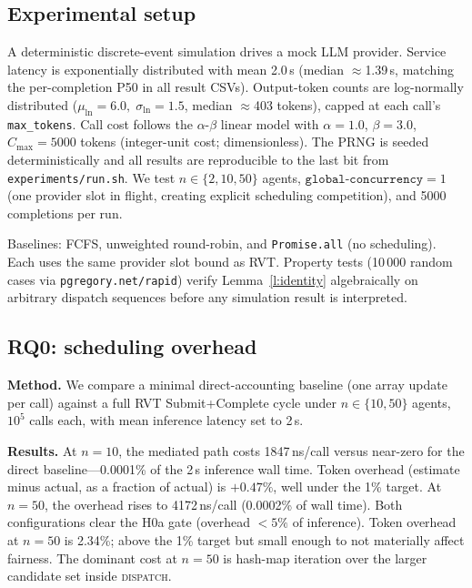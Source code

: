 \documentclass[letterpaper,11pt,leqno]{article}
\begin{document}
\subsection{Experimental setup}\label{s:setup}

A deterministic discrete-event simulation drives a mock LLM provider. Service latency is exponentially distributed with mean 2.0\,s (median $\approx$1.39\,s, matching the per-completion P50 in all result CSVs). Output-token counts are log-normally distributed ($\mu_{\ln}=6.0,\;\sigma_{\ln}=1.5$, median $\approx$403 tokens), capped at each call's \texttt{max\_tokens}. Call cost follows the $\alpha$-$\beta$ linear model with $\alpha=1.0$, $\beta=3.0$, $C_{\max}=5000$ tokens (integer-unit cost; dimensionless). The PRNG is seeded deterministically and all results are reproducible to the last bit from \texttt{experiments/run.sh}. We test $n \in \{2, 10, 50\}$ agents, $\texttt{global-concurrency}=1$ (one provider slot in flight, creating explicit scheduling competition), and 5000 completions per run.

Baselines: FCFS, unweighted round-robin, and \texttt{Promise.all} (no scheduling). Each uses the same provider slot bound as RVT. Property tests (10\,000 random cases via \texttt{pgregory.net/rapid}) verify Lemma~\ref{l:identity} algebraically on arbitrary dispatch sequences before any simulation result is interpreted.

\subsection{RQ0: scheduling overhead}\label{s:overhead}

\textbf{Method.} We compare a minimal direct-accounting baseline (one array update per call) against a full RVT Submit+Complete cycle under $n \in \{10, 50\}$ agents, $10^5$ calls each, with mean inference latency set to 2\,s.

\textbf{Results.} At $n=10$, the mediated path costs 1847\,ns/call versus near-zero for the direct baseline---0.0001\% of the 2\,s inference wall time. Token overhead (estimate minus actual, as a fraction of actual) is $+0.47\%$, well under the 1\% target. At $n=50$, the overhead rises to 4172\,ns/call (0.0002\% of wall time). Both configurations clear the H0a gate (overhead $<5\%$ of inference). Token overhead at $n=50$ is 2.34\%; above the 1\% target but small enough to not materially affect fairness. The dominant cost at $n=50$ is hash-map iteration over the larger candidate set inside \textsc{dispatch}.
\end{document}
